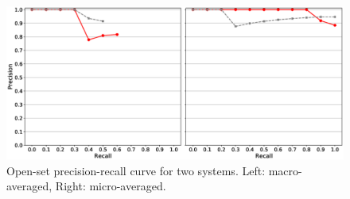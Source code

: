 \begin{figure}[p]
	\begin{center}
    	\includegraphics[scale=0.38]{Figures/prc_macro_micro_count_noise.eps}
		\caption{Open-set precision-recall curve for two systems. Left: macro-averaged, Right: micro-averaged.}
		\label{chap:eval_methods:fig:prc_noise}
	\end{center}






\end{figure}
